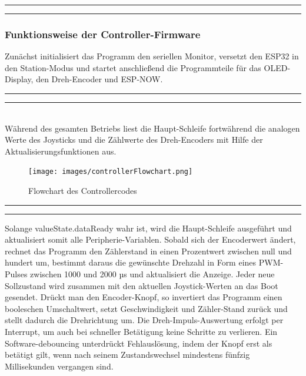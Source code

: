 \documentclass[a4paper,12pt]{article}
\begin{document}
\noindent\rule{\linewidth}{0.4pt}  %



\noindent\rule{\linewidth}{0.4pt} %



\subsubsection{Funktionsweise der Controller-Firmware}

Zunächst initialisiert das Programm den seriellen Monitor, versetzt den ESP32 in den Station-Modus und startet anschließend die Programmteile für das OLED-Display, den Dreh-Encoder und ESP-NOW. 

\newpage
\noindent\rule{\linewidth}{0.4pt}  %

\noindent\rule{\linewidth}{0.4pt}\\[0.5em]  %
Während des gesamten Betriebs liest die Haupt-Schleife fortwährend die analogen Werte des Joysticks und die Zählwerte des Dreh-Encoders mit Hilfe der Aktualisierungsfunktionen aus. 

\begin{figure}[H]
    \centering
    \texttt{[image: images/controllerFlowchart.png]}
    \caption{Flowchart des Controllercodes}
    \label{Controlller-Flowchart}
\end{figure}

\newpage
\noindent\rule{\linewidth}{0.4pt}  %

\noindent\rule{\linewidth}{0.4pt}  %
Solange valueState.dataReady wahr ist, wird die Haupt-Schleife ausgeführt und aktualisiert somit alle Peripherie-Variablen. Sobald sich der Encoderwert ändert, rechnet das Programm den Zählerstand in einen Prozentwert zwischen null und hundert um, bestimmt daraus die gewünschte Drehzahl in Form eines PWM-Pulses zwischen 1000 und 2000 µs und aktualisiert die Anzeige. Jeder neue Sollzustand wird zusammen mit den aktuellen Joystick-Werten an das Boot gesendet. Drückt man den Encoder-Knopf, so invertiert das Programm einen booleschen Umschaltwert, setzt Geschwindigkeit und Zähler-Stand zurück und stellt dadurch die Drehrichtung um. Die Dreh-Impuls-Auswertung erfolgt per Interrupt, um auch bei schneller Betätigung keine Schritte zu verlieren. Ein Software-\gls{debouncing} unterdrückt Fehlauslösung, indem der Knopf erst als betätigt gilt, wenn nach seinem Zustandswechsel mindestens fünfzig Millisekunden vergangen sind.
\end{document}
